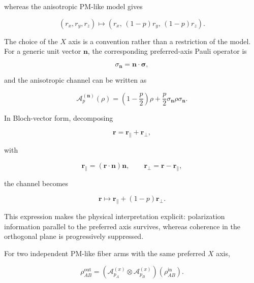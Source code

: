 whereas the anisotropic PM-like model gives

\begin{equation}
(r_x,r_y,r_z)
\longmapsto
\left(
r_x,\,
(1-p)r_y,\,
(1-p)r_z
\right).
\end{equation}

The choice of the \(X\) axis is a convention rather than a restriction of the
model. For a generic unit vector \(\mathbf{n}\), the corresponding preferred-axis
Pauli operator is

\begin{equation}
\sigma_{\mathbf{n}}
=
\mathbf{n}\cdot\boldsymbol{\sigma},
\end{equation}

and the anisotropic channel can be written as

\begin{equation}
\mathcal{A}^{(\mathbf{n})}_{p}(\rho)
=
\left(
1-\frac{p}{2}
\right)\rho
+
\frac{p}{2}
\sigma_{\mathbf{n}}
\rho
\sigma_{\mathbf{n}}.
\label{eq:anisotropic_general_axis_channel}
\end{equation}

In Bloch-vector form, decomposing

\begin{equation}
\mathbf{r}
=
\mathbf{r}_{\parallel}
+
\mathbf{r}_{\perp},
\end{equation}

with

\begin{equation}
\mathbf{r}_{\parallel}
=
(\mathbf{r}\cdot\mathbf{n})\mathbf{n},
\qquad
\mathbf{r}_{\perp}
=
\mathbf{r}
-
\mathbf{r}_{\parallel},
\end{equation}

the channel becomes

\begin{equation}
\mathbf{r}
\longmapsto
\mathbf{r}_{\parallel}
+
(1-p)\mathbf{r}_{\perp}.
\label{eq:anisotropic_general_bloch_map}
\end{equation}

This expression makes the physical interpretation explicit: polarization
information parallel to the preferred axis survives, whereas coherence in the
orthogonal plane is progressively suppressed.

For two independent PM-like fiber arms with the same preferred \(X\) axis,

\begin{equation}
\rho_{AB}^{\mathrm{out}}
=
\left(
\mathcal{A}^{(x)}_{p_A}
\otimes
\mathcal{A}^{(x)}_{p_B}
\right)
\left(
\rho_{AB}^{\mathrm{in}}
\right).
\label{eq:two_arm_anisotropic_x_channel}
\end{equation}


